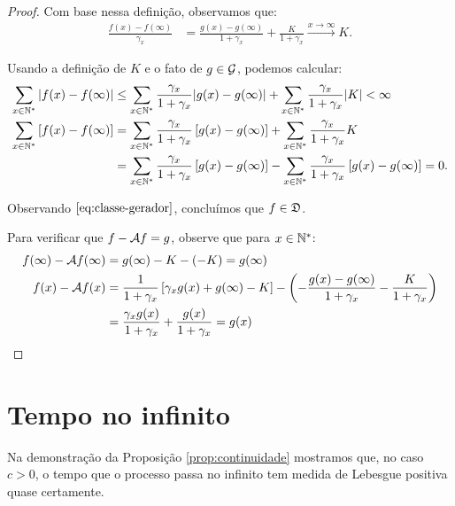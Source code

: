 \begin{proof}
  Com base nessa definição, observamos que:
  \begin{align}
    \label{eq:inversa-imagem-2}
    \frac{f(x) - f(\infty)}{\gamma_x} &=
    \frac{g(x) - g(\infty) }{1+\gamma_x} +
    \frac{K}{1+\gamma_x} \xrightarrow{x \to \infty} K.
  \end{align}

  Usando a definição de $K$ e o fato de $g \in {\mathcal{G}}$, podemos calcular:
  \begin{align*}
    \sum_{x \in {\mathbb{N^*}}} \left|f(x) - f(\infty)\right|
    &\leq \sum_{x\in{\mathbb{N^*}}} \frac{\gamma_x}{1+\gamma_x} |g(x) -
    g(\infty)|
    + \sum_{x\in{\mathbb{N^*}}} \frac{\gamma_x}{1+\gamma_x} |K| < \infty\\
    \sum_{x \in {\mathbb{N^*}}} \left[f(x) - f(\infty)\right]
    &= \sum_{x\in{\mathbb{N^*}}} \frac{\gamma_x}{1+\gamma_x} \left[g(x) -
    g(\infty)\right]
    + \sum_{x\in{\mathbb{N^*}}} \frac{\gamma_x}{1+\gamma_x} K\\
    &= \sum_{x\in{\mathbb{N^*}}} \frac{\gamma_x}{1+\gamma_x} \left[g(x) -
    g(\infty)\right]
  - \sum_{x\in{\mathbb{N^*}}} \frac{\gamma_x}{1+\gamma_x} \left[g(x) -
    g(\infty)\right] = 0.
  \end{align*}

  Observando $\eqref{eq:classe-gerador}$, concluímos que $f \in
  {\mathfrak{D}}$.

  Para verificar que $f - {\mathcal{A}} f = g$, observe que para $x \in {\mathbb{N^*}}$:
  \begin{align*}
    f(\infty) - {\mathcal{A}} f (\infty) &=
    g(\infty) - K - (-K) = g(\infty) \\
    f(x) - {\mathcal{A}} f (x) &=
    \frac{1}{1+\gamma_x} \left[
      \gamma_x g(x) + g(\infty) - K
    \right] - \left(
      - \frac{g(x) - g(\infty) }{1+\gamma_x} -
      \frac{K}{1+\gamma_x}
    \right)\\
    &=
   \frac{\gamma_x g(x)}{1+\gamma_x}
    + \frac{g(x)}{1+\gamma_x} = g(x)
    \qedhere
  \end{align*}
\end{proof}




\section{Tempo no infinito}
\label{sec:tempo-infinito}

Na demonstração da Proposição \ref{prop:continuidade} mostramos que,
no caso $c > 0$, o tempo que o processo passa no infinito tem medida
de Lebesgue positiva quase certamente.

